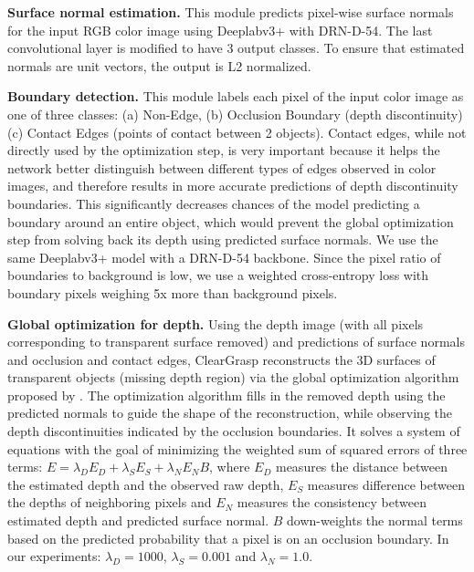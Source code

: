 \documentclass[letterpaper, 10 pt, conference]{ieeeconf}
\newcommand{\myparagraph}[1]{\vspace{0.03in}\noindent\textbf{#1}}
\begin{document}
\myparagraph{Surface normal estimation.}
This module predicts pixel-wise surface normals for the input RGB color image using Deeplabv3+ with DRN-D-54. The last convolutional layer is modified to have 3 output classes. To ensure that estimated normals are unit vectors, the output is L2 normalized. 

\myparagraph{Boundary detection.}
This module labels each pixel of the input color image as one of three classes: (a) Non-Edge, (b) Occlusion Boundary (depth discontinuity) (c) Contact Edges (points of contact between 2 objects). Contact edges, while not directly used by the optimization step, is very important because it helps the network better distinguish between different types of edges observed in color images, and therefore results in more accurate predictions of depth discontinuity boundaries.
This significantly decreases chances of the model predicting a boundary around an entire object, which would prevent the global optimization step from solving back its depth using predicted surface normals.   
We use the same Deeplabv3+ model with a DRN-D-54 backbone. Since the pixel ratio of boundaries to background is low, we use a weighted cross-entropy loss with boundary pixels weighing 5x more than background pixels. 

\myparagraph{Global optimization for depth.}
Using the depth image (with all pixels corresponding to transparent surface removed) and predictions of surface normals and occlusion and contact edges, ClearGrasp reconstructs the 3D surfaces of transparent objects (missing depth region) via the global optimization algorithm proposed by \citet{zhang2018deepdepth}. 
The optimization algorithm fills in the removed depth using the predicted normals to guide the shape of the reconstruction, while observing the depth discontinuities indicated by the occlusion boundaries.
It solves a system of equations with the goal of minimizing the weighted sum of squared errors of three terms:
$E = \lambda _{D} E_{D} + \lambda _{S} E_{S} + \lambda _{N} E_{N} B $, where $E_{D}$ measures the distance between the estimated depth and the observed raw depth, $E_{S}$ measures difference between the depths of neighboring pixels and $E_{N}$ measures the consistency between estimated depth and predicted surface normal. $B$ down-weights the normal terms based on the predicted probability that a pixel is on an occlusion boundary. In our experiments: $\lambda _{D}=1000$, $\lambda _{S}=0.001$ and $\lambda _{N}=1.0$.
\end{document}
